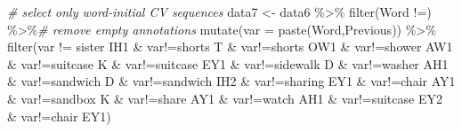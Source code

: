 \documentclass[
]{article}
\newenvironment{Shaded}{\begin{snugshade}}{\end{snugshade}}
\newcommand{\AttributeTok}[1]{\textcolor[rgb]{0.77,0.63,0.00}{#1}}
\newcommand{\CommentTok}[1]{\textcolor[rgb]{0.56,0.35,0.01}{\textit{#1}}}
\newcommand{\FunctionTok}[1]{\textcolor[rgb]{0.00,0.00,0.00}{#1}}
\newcommand{\NormalTok}[1]{#1}
\newcommand{\OtherTok}[1]{\textcolor[rgb]{0.56,0.35,0.01}{#1}}
\newcommand{\SpecialCharTok}[1]{\textcolor[rgb]{0.00,0.00,0.00}{#1}}
\newcommand{\StringTok}[1]{\textcolor[rgb]{0.31,0.60,0.02}{#1}}
\begin{document}
\begin{Shaded}
\begin{Highlighting}[]
\CommentTok{\# select only word{-}initial CV sequences}
\NormalTok{data7 }\OtherTok{\textless{}{-}}\NormalTok{ data6 }\SpecialCharTok{\%\textgreater{}\%}
  \FunctionTok{filter}\NormalTok{(Word }\SpecialCharTok{!=}\StringTok{\textquotesingle{}\textquotesingle{}}\NormalTok{) }\SpecialCharTok{\%\textgreater{}\%}\CommentTok{\# remove empty annotations}
  \FunctionTok{mutate}\NormalTok{(}\AttributeTok{var =} \FunctionTok{paste}\NormalTok{(Word,Previous)) }\SpecialCharTok{\%\textgreater{}\%}
  \FunctionTok{filter}\NormalTok{(var }\SpecialCharTok{!=} \StringTok{\textquotesingle{}sister IH1\textquotesingle{}} \SpecialCharTok{\&}\NormalTok{ var}\SpecialCharTok{!=}\StringTok{\textquotesingle{}shorts T\textquotesingle{}} 
         \SpecialCharTok{\&}\NormalTok{ var}\SpecialCharTok{!=}\StringTok{\textquotesingle{}shorts OW1\textquotesingle{}} \SpecialCharTok{\&}\NormalTok{ var}\SpecialCharTok{!=}\StringTok{\textquotesingle{}shower AW1\textquotesingle{}}
         \SpecialCharTok{\&}\NormalTok{ var}\SpecialCharTok{!=}\StringTok{\textquotesingle{}suitcase K\textquotesingle{}} \SpecialCharTok{\&}\NormalTok{ var}\SpecialCharTok{!=}\StringTok{\textquotesingle{}suitcase EY1\textquotesingle{}}
         \SpecialCharTok{\&}\NormalTok{ var}\SpecialCharTok{!=}\StringTok{\textquotesingle{}sidewalk D\textquotesingle{}} \SpecialCharTok{\&}\NormalTok{ var}\SpecialCharTok{!=}\StringTok{\textquotesingle{}washer AH1\textquotesingle{}} 
         \SpecialCharTok{\&}\NormalTok{ var}\SpecialCharTok{!=}\StringTok{\textquotesingle{}sandwich D\textquotesingle{}} \SpecialCharTok{\&}\NormalTok{ var}\SpecialCharTok{!=}\StringTok{\textquotesingle{}sandwich IH2\textquotesingle{}}
         \SpecialCharTok{\&}\NormalTok{ var}\SpecialCharTok{!=}\StringTok{\textquotesingle{}sharing EY1\textquotesingle{}} \SpecialCharTok{\&}\NormalTok{ var}\SpecialCharTok{!=}\StringTok{\textquotesingle{}chair AY1\textquotesingle{}}
         \SpecialCharTok{\&}\NormalTok{ var}\SpecialCharTok{!=}\StringTok{\textquotesingle{}sandbox K\textquotesingle{}} \SpecialCharTok{\&}\NormalTok{ var}\SpecialCharTok{!=}\StringTok{\textquotesingle{}share AY1\textquotesingle{}}
         \SpecialCharTok{\&}\NormalTok{ var}\SpecialCharTok{!=}\StringTok{\textquotesingle{}watch AH1\textquotesingle{}} \SpecialCharTok{\&}\NormalTok{ var}\SpecialCharTok{!=}\StringTok{\textquotesingle{}suitcase EY2\textquotesingle{}}
         \SpecialCharTok{\&}\NormalTok{ var}\SpecialCharTok{!=}\StringTok{\textquotesingle{}chair EY1\textquotesingle{}}\NormalTok{)}


\end{Highlighting}
\end{Shaded}
\end{document}
